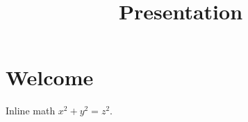 \documentclass{article}
\title{Presentation}
\begin{document}
\section{Welcome}
Inline math $x^2 + y^2 = z^2$.
\end{document}
